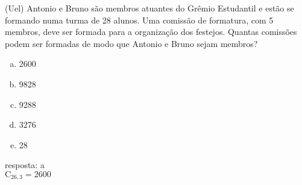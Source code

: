 \begin{ex}
 (Uel) Antonio e Bruno são membros atuantes do Grêmio Estudantil e estão se formando numa turma de 28 alunos. Uma comissão de formatura, com 5 membros, deve ser formada para a organização dos festejos. Quantas comissões podem ser formadas de modo que Antonio e Bruno sejam membros?
    \begin{enumerate}[(a)]
    \item 2600
    \item 9828
    \item 9288
    \item 3276
    \item 28
    \end{enumerate}
      \begin{sol}
       resposta: a\\
       $\mathrm{C}_{{26},3}=2600$
      \end{sol}
\end{ex}